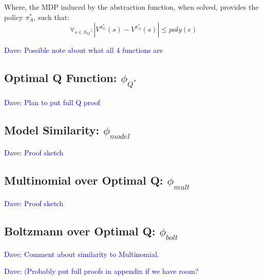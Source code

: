 \documentclass{article}
\newcommand\dnote[1]{\textcolor{blue}{Dave: #1}}
\begin{document}
Where, the MDP induced by the abstraction function, when solved, provides the policy $\pi^*_A$, such that:
\begin{equation}
\forall_{s \in S_M} : | V^{\pi^*_G}(s) - V^{\pi^*_{A}}(s) | \leq poly(\epsilon)
\end{equation}

\dnote{Possible note about what all 4 functions are}

\subsection{Optimal Q Function: $\phi_{Q^*}$}


\dnote{Plan to put full Q proof}


\subsection{Model Similarity: $\phi_{model}$}


\dnote{Proof sketch}

\subsection{Multinomial over Optimal Q: $\phi_{mult}$}

\dnote{Proof sketch}

\subsection{Boltzmann over Optimal Q: $\phi_{bolt}$}

\dnote{Comment about similarity to Multinomial.}

\dnote{(Probably put full proofs in appendix if we have room?}











\end{document}
